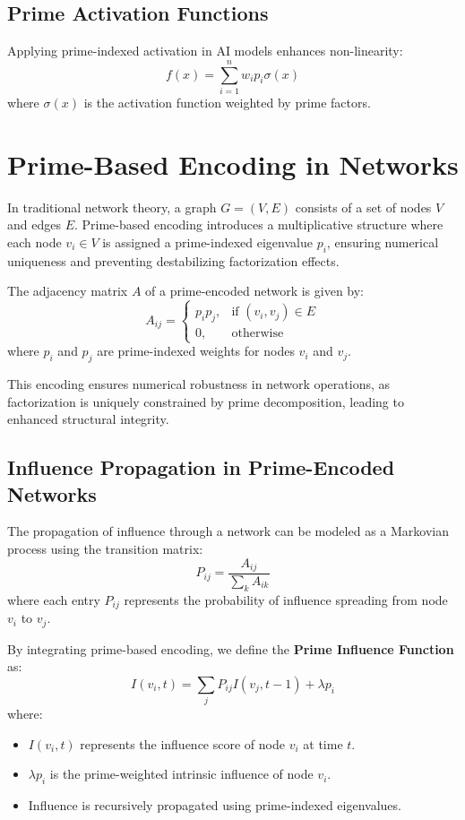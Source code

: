\documentclass{article}
\begin{document}
\subsection{Prime Activation Functions}
Applying prime-indexed activation in AI models enhances non-linearity:
\begin{equation}
    f(x) = \sum_{i=1}^{n} w_i p_i \sigma(x)
\end{equation}
where \( \sigma(x) \) is the activation function weighted by prime factors.

\section{Prime-Based Encoding in Networks}

In traditional network theory, a graph $G = (V, E)$ consists of a set of nodes $V$ and edges $E$. Prime-based encoding introduces a multiplicative structure where each node $v_i \in V$ is assigned a prime-indexed eigenvalue $p_i$, ensuring numerical uniqueness and preventing destabilizing factorization effects.

The adjacency matrix $A$ of a prime-encoded network is given by:
\begin{equation}
    A_{ij} = \begin{cases}
        p_i p_j, & \text{if } (v_i, v_j) \in E \\
        0, & \text{otherwise}
    \end{cases}
\end{equation}
where $p_i$ and $p_j$ are prime-indexed weights for nodes $v_i$ and $v_j$.

This encoding ensures numerical robustness in network operations, as factorization is uniquely constrained by prime decomposition, leading to enhanced structural integrity.

\subsection{Influence Propagation in Prime-Encoded Networks}

The propagation of influence through a network can be modeled as a Markovian process using the transition matrix:
\begin{equation}
    P_{ij} = \frac{A_{ij}}{\sum_{k} A_{ik}}
\end{equation}
where each entry $P_{ij}$ represents the probability of influence spreading from node $v_i$ to $v_j$.

By integrating prime-based encoding, we define the \textbf{Prime Influence Function} as:
\begin{equation}
    I(v_i, t) = \sum_{j} P_{ij} I(v_j, t-1) + \lambda p_i
\end{equation}
where:
\begin{itemize}
    \item $I(v_i, t)$ represents the influence score of node $v_i$ at time $t$.
    \item $\lambda p_i$ is the prime-weighted intrinsic influence of node $v_i$.
    \item Influence is recursively propagated using prime-indexed eigenvalues.
\end{itemize}
\end{document}
